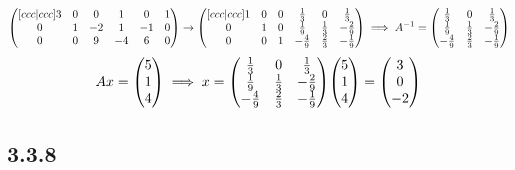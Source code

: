 \documentclass[12pt,titlepage]{extarticle}
\begin{document}
\begin{align*}
\begin{pmatrix}[ccc|ccc]
        3 & 0  & 0  & 1  & 0  & 1 \\
        0 & 1  & -2 & 1  & -1 & 0 \\
        0 & 0  & 9 & -4  & 6  & 0 \\
    \end{pmatrix} \rightarrow
    \begin{pmatrix}[ccc|ccc]
        1 & 0  & 0 & \frac{1}{3}  & 0  & \frac{1}{3} \\
        0 & 1  & 0 & \frac{1}{9}  & \frac{1}{3} & -\frac{2}{9} \\
        0 & 0  & 1 & -\frac{4}{9}  & \frac{2}{3}  & -\frac{1}{9} \\
    \end{pmatrix} \implies A^{-1} = \mqty(
         \frac{1}{3}  & 0  & \frac{1}{3} \\
         \frac{1}{9}  & \frac{1}{3} & -\frac{2}{9} \\
         -\frac{4}{9}  & \frac{2}{3}  & -\frac{1}{9} \\
        )
\end{align*}
\[
    Ax = \mqty(5 \\ 1 \\ 4) \implies x = \mqty(
         \frac{1}{3}  & 0  & \frac{1}{3} \\
         \frac{1}{9}  & \frac{1}{3} & -\frac{2}{9} \\
         -\frac{4}{9}  & \frac{2}{3}  & -\frac{1}{9} \\
        ) \mqty(5 \\ 1 \\ 4)
        = \mqty(3 \\ 0 \\ -2)
\]

\subsection*{3.3.8}
\end{document}

